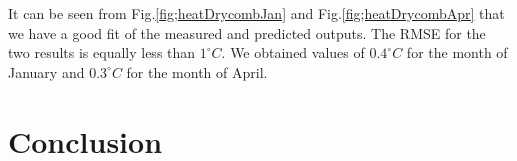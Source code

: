 \documentclass[a4paper,12pt]{report}
\numberwithin{equation}{section}
\begin{document}
It can be seen from Fig.\ref{fig;heatDrycombJan} and Fig.\ref{fig;heatDrycombApr} that we have a good fit of the measured and predicted outputs. The RMSE for the two results is equally less than $1^{\circ} C$. We obtained values of $0.4^{\circ} C$ for the month of January and $0.3^{\circ} C$
for the month of April.

\newpage
\chapter{Conclusion}
\end{document}
